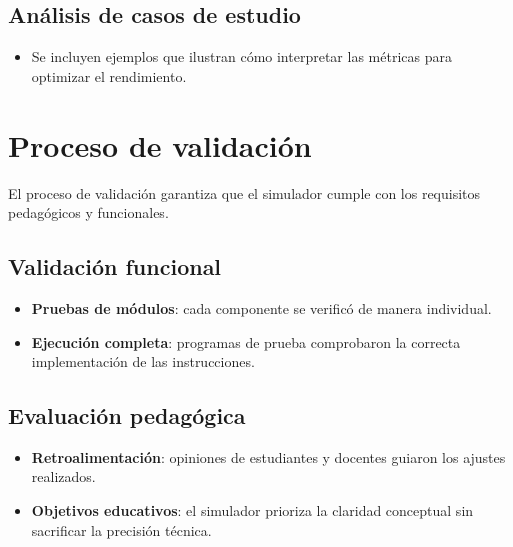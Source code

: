 \documentclass[12pt,oneside]{templates/unerthesis}
\providecommand{\tightlist}{%
  \setlength{\itemsep}{0pt}\setlength{\parskip}{0pt}}
\begin{document}
\hypertarget{anuxe1lisis-de-casos-de-estudio}{%
\subsection{Análisis de casos de estudio}\label{anuxe1lisis-de-casos-de-estudio}}

\begin{itemize}
\tightlist
\item
  Se incluyen ejemplos que ilustran cómo interpretar las métricas para optimizar el rendimiento.
\end{itemize}

\hypertarget{proceso-de-validaciuxf3n}{%
\section{Proceso de validación}\label{proceso-de-validaciuxf3n}}

El proceso de validación garantiza que el simulador cumple con los requisitos pedagógicos y funcionales.

\hypertarget{validaciuxf3n-funcional}{%
\subsection{Validación funcional}\label{validaciuxf3n-funcional}}

\begin{itemize}
\tightlist
\item
  \textbf{Pruebas de módulos}: cada componente se verificó de manera individual.
\item
  \textbf{Ejecución completa}: programas de prueba comprobaron la correcta implementación de las instrucciones.
\end{itemize}

\hypertarget{evaluaciuxf3n-pedaguxf3gica}{%
\subsection{Evaluación pedagógica}\label{evaluaciuxf3n-pedaguxf3gica}}

\begin{itemize}
\tightlist
\item
  \textbf{Retroalimentación}: opiniones de estudiantes y docentes guiaron los ajustes realizados.
\item
  \textbf{Objetivos educativos}: el simulador prioriza la claridad conceptual sin sacrificar la precisión técnica.
\end{itemize}
\end{document}
